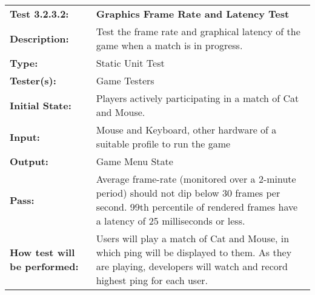 \documentclass[12pt, titlepage]{article}
\begin{document}
\begin{mdframed}[linewidth=1pt]
\begin{tabularx}{\textwidth}{@{}p{3cm}X@{}}
{\bf Test 3.2.3.2:} & {\bf Graphics Frame Rate and Latency Test}\\[\baselineskip]
{\bf Description:} & Test the frame rate and graphical latency of the game when a match is in progress. \\[0.5\baselineskip]
{\bf Type:} & Static Unit Test\\[0.5\baselineskip]
{\bf Tester(s):} & Game Testers\\[0.5\baselineskip]
{\bf Initial State:} & Players actively participating in a match of Cat and Mouse. \\[0.5\baselineskip]
{\bf Input:} & Mouse and Keyboard, other hardware of a suitable profile to run the game\\[0.5\baselineskip]
{\bf Output:} & Game Menu State\\[0.5\baselineskip]
{\bf Pass:} & Average frame-rate (monitored over a 2-minute period) should not dip below 30 frames per second. 99th percentile of rendered frames have a latency of 25 milliseconds or less. \\[0.5\baselineskip]
{\bf How test will be performed:} & Users will play a match of Cat and Mouse, in which ping will be displayed to them. As they are playing, developers will watch and record highest ping for each user. 
\end{tabularx}
\end{mdframed}
\end{document}
